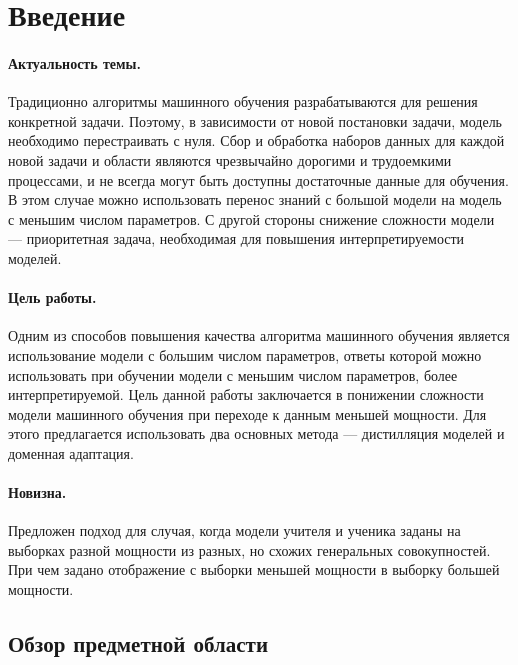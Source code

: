 \newpage


\section{Введение}

\paragraph{Актуальность темы.} Традиционно алгоритмы машинного обучения разрабатываются для решения конкретной задачи. Поэтому, в зависимости от новой постановки задачи, модель необходимо перестраивать с нуля. Сбор и обработка наборов данных для каждой новой задачи и области являются чрезвычайно дорогими и трудоемкими процессами, и не всегда могут быть доступны достаточные данные для обучения. В этом случае можно использовать перенос знаний с большой модели на модель с меньшим числом параметров. С другой стороны снижение сложности модели --- приоритетная задача, необходимая для повышения интерпретируемости моделей.

\paragraph{Цель работы.} Одним из способов повышения качества алгоритма машинного обучения является использование модели с большим числом параметров, ответы которой можно использовать при обучении модели с меньшим числом параметров, более интерпретируемой. Цель данной работы заключается в понижении сложности модели машинного обучения при переходе к данным меньшей мощности. Для этого предлагается использовать два основных метода --- дистилляция моделей и доменная адаптация.

\paragraph{Новизна.} Предложен подход для случая, когда модели учителя и ученика заданы на выборках разной мощности из разных, но схожих генеральных совокупностей. При чем задано отображение с выборки меньшей мощности в выборку большей мощности.

\subsection{Обзор предметной области}


